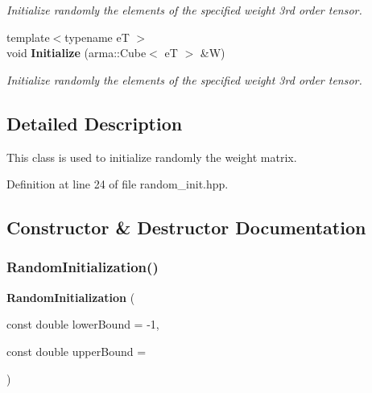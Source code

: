 \begin{DoxyCompactItemize}
\begin{DoxyCompactList}\small\item\em Initialize randomly the elements of the specified weight 3rd order tensor. \end{DoxyCompactList}\item 
{\footnotesize template$<$typename eT $>$ }\\void \textbf{ Initialize} (arma\+::\+Cube$<$ eT $>$ \&W)
\begin{DoxyCompactList}\small\item\em Initialize randomly the elements of the specified weight 3rd order tensor. \end{DoxyCompactList}\end{DoxyCompactItemize}


\subsection{Detailed Description}
This class is used to initialize randomly the weight matrix. 

Definition at line 24 of file random\+\_\+init.\+hpp.



\subsection{Constructor \& Destructor Documentation}
\mbox{\label{classmlpack_1_1ann_1_1RandomInitialization_a7e4ae84b793b74a3cbf91e3f26ea92bc}} 
\subsubsection{Random\+Initialization()\hspace{0.1cm}{\footnotesize\ttfamily [1/2]}}
{\footnotesize\ttfamily \textbf{ Random\+Initialization} (\begin{DoxyParamCaption}\item[{const double}]{lower\+Bound = {\ttfamily -\/1},  }\item[{const double}]{upper\+Bound = {} }\end{DoxyParamCaption})\hspace{0.3cm}{\ttfamily [inline]}}




